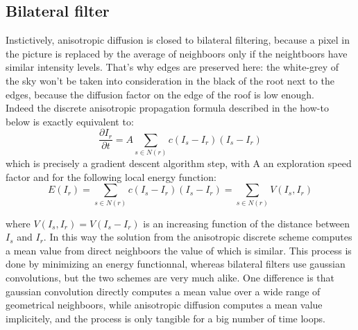 \documentclass[12pt,a4paper]{article}
\begin{document}
\subsection{Bilateral filter}

Instictively, anisotropic diffusion is closed to bilateral filtering, because a pixel in the picture is replaced by the average of neighboors only if the neightboors have similar intensity levels. That's why edges are preserved here: the white-grey of the sky won't be taken into consideration in the black of the root next to the edges, because the diffusion factor on the edge of the roof is low enough.
\\
Indeed the discrete anisotropic propagation formula described in the how-to below is exactly equivalent to:
\begin{equation}
\frac{\partial I_{r}}{\partial t} = A \sum_{s \in N(r)}c(I_{s} - I_{r})(I_{s} - I_{r})
\end{equation}
which is precisely a gradient descent algorithm step, with A an exploration speed factor and for the following local energy function:
\begin{equation}
E(I_{r}) = \sum_{s \in N(r)}c(I_{s} - I_{r})(I_{s} - I_{r}) = \sum_{s \in N(r)}V(I_{s}, I_{r})
\end{equation}

where $V(I_{s}, I_{r}) = V(I_{s} - I_{r})$ is an increasing function of the distance between $I_{s}$ and $I_{r}$. In this way the solution from the anisotropic discrete scheme computes a mean value from direct neighboors the value of which is similar. This process is done by minimizing an energy functionnal, whereas bilateral filters use gaussian convolutions, but the two schemes are very much alike. One difference is that gaussian convolution directly computes a mean value over a wide range of geometrical neighboors, while anisotropic diffusion computes a mean value implicitely, and the process is only tangible for a big number of time loops. 
\end{document}
